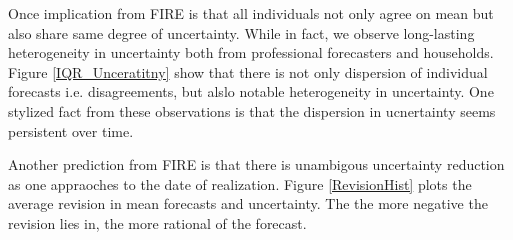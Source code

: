 \documentclass[]{article}
\begin{document}
Once implication from FIRE is that all individuals not only agree on mean but also share same degree of uncertainty. While in fact, we observe long-lasting heterogeneity in uncertainty both from professional forecasters and households. Figure \ref{IQR_Unceratitny} show that there is  not only dispersion of individual forecasts i.e. disagreements, but alslo notable heterogeneity in uncertainty. One stylized fact from these observations is that  the dispersion in ucnertainty seems persistent over time.  
 

Another prediction from FIRE is that there is unambigous uncertainty reduction as one appraoches to the date of realization. Figure \ref{RevisionHist} plots the average revision in mean forecasts and uncertainty. The the more negative the revision lies in, the more rational of the forecast.  
\end{document}
